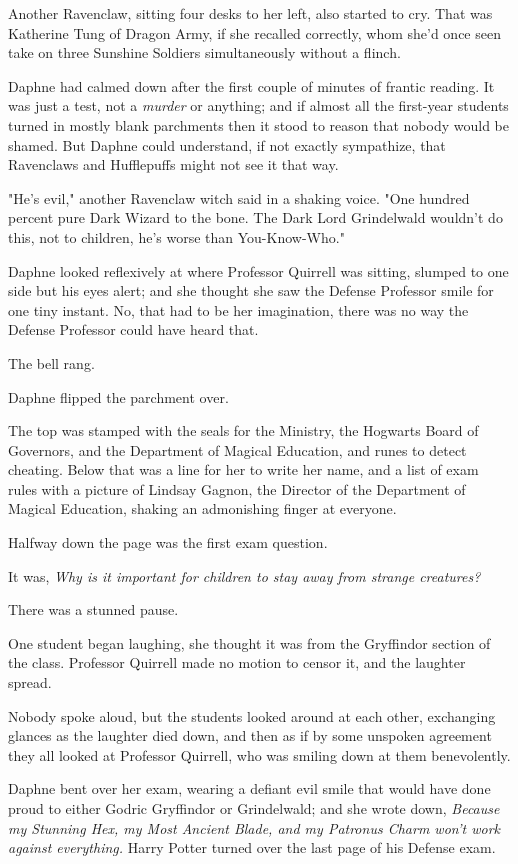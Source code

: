 Another Ravenclaw, sitting four desks to her left, also started to cry. That 
was Katherine Tung of Dragon Army, if she recalled correctly, whom she'd once 
seen take on three Sunshine Soldiers simultaneously without a flinch.

Daphne had calmed down after the first couple of minutes of frantic reading. It 
was just a test, not a \emph{murder} or anything; and if almost all the 
first-year students turned in mostly blank parchments then it stood to reason 
that nobody would be shamed. But Daphne could understand, if not exactly 
sympathize, that Ravenclaws and Hufflepuffs might not see it that way.

"He's evil," another Ravenclaw witch said in a shaking voice. "One hundred 
percent pure Dark Wizard to the bone. The Dark Lord Grindelwald wouldn't do 
this, not to children, he's worse than You-Know-Who."

Daphne looked reflexively at where Professor Quirrell was sitting, slumped to 
one side but his eyes alert; and she thought she saw the Defense Professor 
smile for one tiny instant. No, that had to be her imagination, there was no 
way the Defense Professor could have heard that.

The bell rang.

Daphne flipped the parchment over.

The top was stamped with the seals for the Ministry, the Hogwarts Board of 
Governors, and the Department of Magical Education, and runes to detect 
cheating. Below that was a line for her to write her name, and a list of exam 
rules with a picture of Lindsay Gagnon, the Director of the Department of 
Magical Education, shaking an admonishing finger at everyone.

Halfway down the page was the first exam question.

It was, \emph{Why is it important for children to stay away from strange 
creatures?}

There was a stunned pause.

One student began laughing, she thought it was from the Gryffindor section of 
the class. Professor Quirrell made no motion to censor it, and the laughter 
spread.

Nobody spoke aloud, but the students looked around at each other, exchanging 
glances as the laughter died down, and then as if by some unspoken agreement 
they all looked at Professor Quirrell, who was smiling down at them 
benevolently.

Daphne bent over her exam, wearing a defiant evil smile that would have done 
proud to either Godric Gryffindor or Grindelwald; and she wrote down, 
\emph{Because my Stunning Hex, my Most Ancient Blade, and my Patronus Charm 
won't work against everything.}
\sbreak
Harry Potter turned over the last page of his Defense exam.

